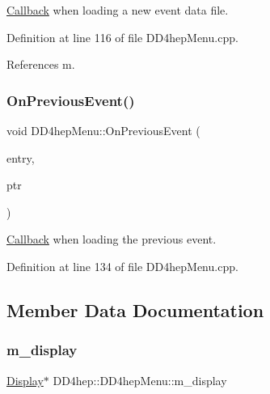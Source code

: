 \hyperlink{class_d_d4hep_1_1_callback}{Callback} when loading a new event data file. 



Definition at line 116 of file D\+D4hep\+Menu.\+cpp.



References m.

\hypertarget{class_d_d4hep_1_1_d_d4hep_menu_aa5da4d833f39a73fe9f22e0b0016018e}{}\label{class_d_d4hep_1_1_d_d4hep_menu_aa5da4d833f39a73fe9f22e0b0016018e} 
\subsubsection{\texorpdfstring{On\+Previous\+Event()}{OnPreviousEvent()}}
{\footnotesize\ttfamily void D\+D4hep\+Menu\+::\+On\+Previous\+Event (\begin{DoxyParamCaption}\item[{T\+G\+Menu\+Entry $\ast$}]{entry,  }\item[{void $\ast$}]{ptr }\end{DoxyParamCaption})}



\hyperlink{class_d_d4hep_1_1_callback}{Callback} when loading the previous event. 



Definition at line 134 of file D\+D4hep\+Menu.\+cpp.



\subsection{Member Data Documentation}
\hypertarget{class_d_d4hep_1_1_d_d4hep_menu_a684595fdba5b0f4fb8421ee39f75ad68}{}\label{class_d_d4hep_1_1_d_d4hep_menu_a684595fdba5b0f4fb8421ee39f75ad68} 
\subsubsection{\texorpdfstring{m\+\_\+display}{m\_display}}
{\footnotesize\ttfamily \hyperlink{class_d_d4hep_1_1_display}{Display}$\ast$ D\+D4hep\+::\+D\+D4hep\+Menu\+::m\+\_\+display\hspace{0.3cm}{\ttfamily [protected]}}



